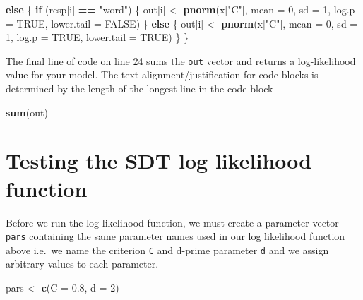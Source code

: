 \documentclass[]{book}
\newenvironment{Shaded}{\begin{snugshade}}{\end{snugshade}}
\newcommand{\ControlFlowTok}[1]{\textcolor[rgb]{0.13,0.29,0.53}{\textbf{#1}}}
\newcommand{\DataTypeTok}[1]{\textcolor[rgb]{0.13,0.29,0.53}{#1}}
\newcommand{\DecValTok}[1]{\textcolor[rgb]{0.00,0.00,0.81}{#1}}
\newcommand{\FloatTok}[1]{\textcolor[rgb]{0.00,0.00,0.81}{#1}}
\newcommand{\KeywordTok}[1]{\textcolor[rgb]{0.13,0.29,0.53}{\textbf{#1}}}
\newcommand{\NormalTok}[1]{#1}
\newcommand{\OperatorTok}[1]{\textcolor[rgb]{0.81,0.36,0.00}{\textbf{#1}}}
\newcommand{\OtherTok}[1]{\textcolor[rgb]{0.56,0.35,0.01}{#1}}
\newcommand{\StringTok}[1]{\textcolor[rgb]{0.31,0.60,0.02}{#1}}
\begin{document}
\begin{Shaded}
\begin{Highlighting}[numbers=left,,firstnumber=18,]
\ControlFlowTok{else}\NormalTok{ \{}
  \ControlFlowTok{if}\NormalTok{ (resp[i] }\OperatorTok{==}\StringTok{ "word"}\NormalTok{) \{}
\NormalTok{    out[i] <-}\StringTok{ }\KeywordTok{pnorm}\NormalTok{(x[}\StringTok{"C"}\NormalTok{], }\DataTypeTok{mean =} \DecValTok{0}\NormalTok{, }\DataTypeTok{sd =} \DecValTok{1}\NormalTok{, }
                    \DataTypeTok{log.p =} \OtherTok{TRUE}\NormalTok{, }\DataTypeTok{lower.tail =} \OtherTok{FALSE}\NormalTok{)}
\NormalTok{        \} }\ControlFlowTok{else}\NormalTok{ \{}
\NormalTok{          out[i] <-}\StringTok{ }\KeywordTok{pnorm}\NormalTok{(x[}\StringTok{"C"}\NormalTok{], }\DataTypeTok{mean =} \DecValTok{0}\NormalTok{, }\DataTypeTok{sd =} \DecValTok{1}\NormalTok{, }
                         \DataTypeTok{log.p =} \OtherTok{TRUE}\NormalTok{, }\DataTypeTok{lower.tail =} \OtherTok{TRUE}\NormalTok{)}
\NormalTok{        \}}
\NormalTok{      \}}
\end{Highlighting}
\end{Shaded}

The final line of code on line 24 sums the \texttt{out} vector and returns a log-likelihood value for your model.
 The text alignment/justification for code blocks is determined by the length of the longest line in the code block

\begin{Shaded}
\begin{Highlighting}[]
\KeywordTok{sum}\NormalTok{(out)}
\end{Highlighting}
\end{Shaded}

\hypertarget{testing-the-sdt-log-likelihood-function}{%
\section{Testing the SDT log likelihood function}\label{testing-the-sdt-log-likelihood-function}}

Before we run the log likelihood function, we must create a parameter vector \texttt{pars} containing the same parameter names used in our log likelihood function above i.e.~we name the criterion \texttt{C} and d-prime parameter \texttt{d} and we assign arbitrary values to each parameter.

\begin{Shaded}
\begin{Highlighting}[]
\NormalTok{pars <-}\StringTok{ }\KeywordTok{c}\NormalTok{(}\DataTypeTok{C =} \FloatTok{0.8}\NormalTok{, }\DataTypeTok{d =} \DecValTok{2}\NormalTok{)}
\end{Highlighting}
\end{Shaded}
\end{document}
